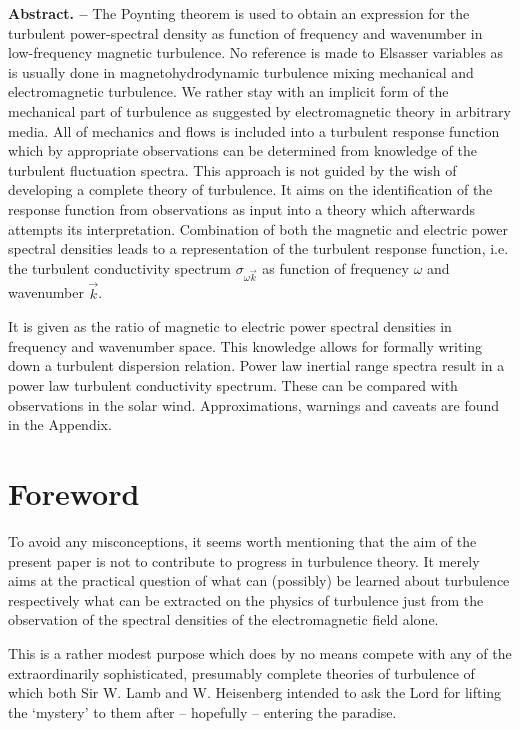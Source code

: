 \documentclass[ ]{copernicus2}
\begin{document}
{\bf Abstract. --} The Poynting theorem is used to obtain an expression for the turbulent power-spectral density as function of frequency and wavenumber in low-frequency magnetic turbulence. No reference is made to Elsasser variables as is usually done in magnetohydrodynamic turbulence mixing mechanical and electromagnetic turbulence. We rather stay with an implicit form of the mechanical part of turbulence as suggested by electromagnetic theory in arbitrary media. All of mechanics and flows is included into a turbulent response function which by appropriate observations can be determined from knowledge of the turbulent fluctuation spectra. This approach is not guided by the wish of developing a complete theory of turbulence. It aims on the identification of the response function from observations as input into a theory which afterwards attempts its interpretation. Combination of both the magnetic and electric power spectral densities leads to a representation of the turbulent response function, i.e. the turbulent conductivity spectrum $\sigma_{\omega \vec{k}}$ as function of frequency $\omega$ and wavenumber $\vec{k}$. {It is given as the ratio of magnetic to electric power spectral densities in frequency and wavenumber space. This knowledge allows for formally writing down a turbulent dispersion relation. Power law inertial range spectra result in a power law turbulent conductivity spectrum.  These can be compared with observations in the solar wind. {Approximations, warnings and caveats are found in the Appendix. } 

\section{Foreword}
To avoid any misconceptions, it seems worth mentioning that the aim of the present paper is not to contribute to progress in turbulence theory. It merely aims at the practical question of what can (possibly) be learned about turbulence respectively what can be extracted on the physics of turbulence just from the observation of the spectral densities of the electromagnetic field alone. 

This is a rather modest purpose which does by no means compete with any of the extraordinarily sophisticated, presumably complete theories of turbulence of which both Sir W. Lamb and W. Heisenberg intended to ask the Lord for lifting the `mystery' to them after -- hopefully -- entering the paradise. 

}
\end{document}
